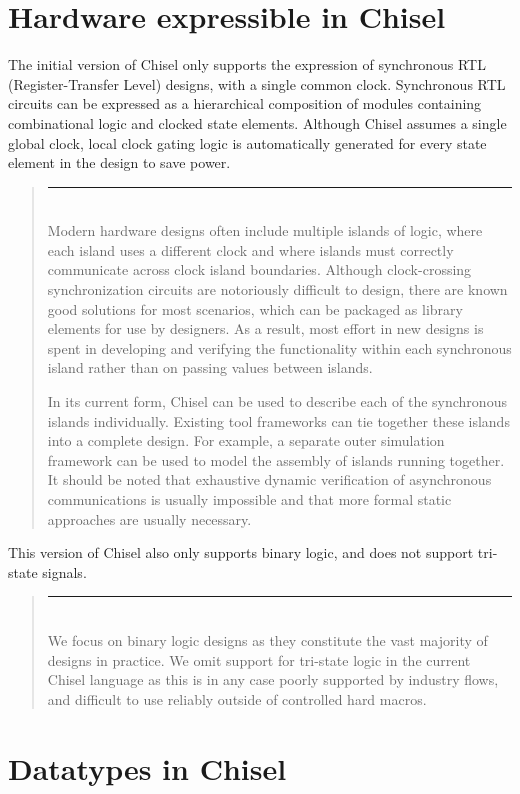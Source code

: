 \documentclass[twocolumn,10pt]{article}
\newenvironment{commentary}
{ \vspace{-0.1in}
  \begin{quotation}
  \noindent
  \small \em
  \rule{\linewidth}{1pt}\\
}
{
  \end{quotation}
}
\begin{document}
\section{Hardware expressible in Chisel}

The initial version of Chisel only supports the expression of
synchronous RTL (Register-Transfer Level) designs, with a single
common clock.  Synchronous RTL circuits can be expressed as a
hierarchical composition of modules containing combinational logic and
clocked state elements.  Although Chisel assumes a single global
clock, local clock gating logic is automatically generated for every
state element in the design to save power.
\begin{commentary}
Modern hardware designs often include multiple islands of logic, where
each island uses a different clock and where islands must correctly
communicate across clock island boundaries.  Although clock-crossing
synchronization circuits are notoriously difficult to design, there
are known good solutions for most scenarios, which can be packaged as
library elements for use by designers.  As a result, most effort in
new designs is spent in developing and verifying the functionality
within each synchronous island rather than on passing values between
islands.

In its current form, Chisel can be used to describe each of the
synchronous islands individually. Existing tool frameworks can tie
together these islands into a complete design.  For example, a
separate outer simulation framework can be used to model the assembly
of islands running together.  It should be noted that exhaustive
dynamic verification of asynchronous communications is usually
impossible and that more formal static approaches are usually
necessary.
\end{commentary}

This version of Chisel also only supports binary logic, and does not
support tri-state signals.
\begin{commentary}
We focus on binary logic designs as they constitute the vast majority
of designs in practice.  We omit support for tri-state logic in the
current Chisel language as this is in any case poorly supported by
industry flows, and difficult to use reliably outside of controlled
hard macros.
\end{commentary}

\section{Datatypes in Chisel}
\end{document}
